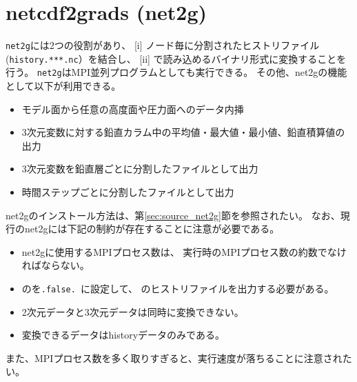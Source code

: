 \section{netcdf2grads (net2g)} \label{sec:net2g}

\verb|net2g|には2つの役割があり、
[i] ノード毎に分割されたヒストリファイル(\verb|history.***.nc|）を結合し、
[ii] {\grads}で読み込めるバイナリ形式に変換することを行う。
\verb|net2g|はMPI並列プログラムとしても実行できる。
その他、net2gの機能として以下が利用できる。
%
\begin{itemize}
 \item モデル面から任意の高度面や圧力面へのデータ内挿
 \item 3次元変数に対する鉛直カラム中の平均値・最大値・最小値、鉛直積算値の出力
 \item 3次元変数を鉛直層ごとに分割したファイルとして出力
 \item 時間ステップごとに分割したファイルとして出力
\end{itemize}

net2gのインストール方法は、第\ref{sec:source_net2g}節を参照されたい。
なお、現行のnet2gには下記の制約が存在することに注意が必要である。
\begin{itemize}
 \item net2gに使用するMPIプロセス数は、
\scalerm 実行時のMPIプロセス数の約数でなければならない。
\item {}のを\verb|.false. |に設定して、
\scalerm のヒストリファイルを出力する必要がある。
 \item 2次元データと3次元データは同時に変換できない。
 \item 変換できるデータはhistoryデータのみである。
\end{itemize}
また、MPIプロセス数を多く取りすぎると、実行速度が落ちることに注意されたい。


